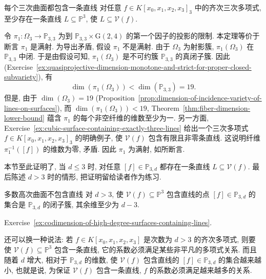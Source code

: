 \begin{Theorem}{每个三次曲面都包含一条直线}\leavevmode\label{thm:cubic-surface-contains-line}
对任意 $f\in K[x_{0},x_{1},x_{2},x_{3}]_{3}$ 中的齐次三次多项式, 至少存在一条直线 $L\subseteq\mathbb{P}^{3}$, 使 $L\subseteq\mathcal{V}(f)$.
\end{Theorem}
\begin{Proof}
令 $\pi_{1}:\Omega_{3}\to\mathbb{P}_{3,3}$ 为到 $\mathbb{P}_{3,3}\times\mathrm{G}(2,4)$ 的第一个因子的投影的限制. 本定理等价于断言 $\pi_{1}$ 是满射. 为导出矛盾, 假设 $\pi_{1}$ 不是满射. 由于 $\Omega_{3}$ 为射影簇, $\pi_{1}(\Omega_{3})$ 在 $\mathbb{P}_{3,3}$ 中闭. 于是由假设可知, $\pi_{1}(\Omega_{3})$ 是不可约簇 $\mathbb{P}_{3,3}$ 的真闭子簇. 因此 (Exercise~\ref{ex:quasiprojective-dimension-monotone-and-strict-for-proper-closed-subvariety}), 有
\[
  \dim(\pi_{1}(\Omega_{3}))<\dim(\mathbb{P}_{3,3})=19.
\]
但是, 由于 $\dim(\Omega_{3})=19$ (Proposition~\ref{prop:dimension-of-incidence-variety-of-lines-on-surfaces}), 而 $\dim(\pi_{1}(\Omega_{3}))<19$, Theorem~\ref{thm:fiber-dimension-lower-bound} 蕴含 $\pi_{1}$ 的每个非空纤维的维数至少为一. 另一方面, Exercise~\ref{ex:cubic-surface-containing-exactly-three-lines} 给出一个三次多项式 $f\in K[x_{0},x_{1},x_{2},x_{3}]_{3}$ 的明确例子, 使 $\mathcal{V}(f)$ 包含有限且非零条直线. 这说明纤维 $\pi_{1}^{-1}([f])$ 的维数为零, 矛盾. 因此 $\pi_{1}$ 为满射, 如所断言.
\end{Proof}

本节至此证明了, 当 $d\le3$ 时, 对任意 $[f]\in\mathbb{P}_{3,d}$ 都存在一条直线 $L\subseteq\mathcal{V}(f)$. 最后陈述 $d>3$ 时的情形, 把证明留给读者作为练习.

\begin{Proposition}{多数高次曲面不包含直线}\leavevmode\label{prop:high-degree-surfaces-containing-lines-have-large-codimension}
对 $d>3$, 使 $\mathcal{V}(f)\subseteq\mathbb{P}^{3}$ 包含直线的点 $[f]\in\mathbb{P}_{3,d}$ 的集合是 $\mathbb{P}_{3,d}$ 的闭子簇, 其余维至少为 $d-3$.
\end{Proposition}
\begin{Proof}
Exercise~\ref{ex:codimension-of-high-degree-surfaces-containing-lines}.
\end{Proof}

还可以换一种说法: 若 $f\in K[x_{0},x_{1},x_{2},x_{3}]$ 是次数为 $d>3$ 的齐次多项式, 则要使 $\mathcal{V}(f)\subseteq\mathbb{P}^{3}$ 包含一条直线, 它的系数必须满足某些非平凡的多项式关系. 而且随着 $d$ 增大, 相对于 $\mathbb{P}_{3,d}$ 的维数, 使 $\mathcal{V}(f)$ 包含直线的 $[f]\in\mathbb{P}_{3,d}$ 的集合越来越小, 也就是说, 为保证 $\mathcal{V}(f)$ 包含一条直线, $f$ 的系数必须满足越来越多的关系.

